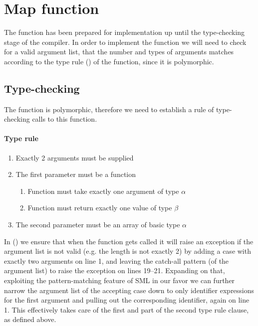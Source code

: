 %
%
%

\section{Map function}
\label{sec:map}
The  function has been prepared for implementation up until the
type-checking stage of the compiler. In order to implement the 
function we will need to check for a valid argument list, that the number and
types of arguments matches according to the type rule
() of the  function, since it is
polymorphic.

\subsection{Type-checking}
\label{sec:map|sub:typecheck}
The  function is polymorphic, therefore we need to establish a rule
of type-checking calls to this function.

\paragraph{Type rule}
\begin{enumerate}
	\item Exactly 2 arguments must be supplied
	\item The first parameter must be a function 
	\begin{enumerate}
		\item Function  must take exactly one argument of type $\alpha$
		\item Function  must return exactly one value of type $\beta$
	\end{enumerate}
	\item The second parameter must be an array  of basic type
	$\alpha$
\end{enumerate}

In  () we ensure that
when the  function gets called it will raise an exception if the
argument list is not valid (e.g. the length is not exactly 2) by adding a case
with exactly two arguments on line 1, and leaving the catch-all pattern (of
the argument list) to raise the exception on lines 19--21. Expanding on that,
exploiting the pattern-matching feature of SML in our favor we can further
narrow the argument list of the accepting case down to only identifier
expressions for the first argument and pulling out the corresponding
identifier, again on line 1. This effectively takes care of the first and
part of the second type rule clause, as defined above.

